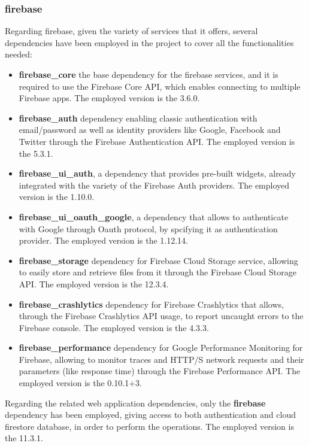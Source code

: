 \subsubsection{firebase}
Regarding firebase, given the variety of services that it offers, several dependencies have been employed in the project to cover all the functionalities needed:

\begin{itemize}[nosep] %
    \item \textbf{firebase\_core\:} the base dependency for the firebase services, and it is required to use the Firebase Core API, which enables connecting to multiple Firebase apps. The employed version is the 3.6.0.
    \item \textbf{firebase\_auth\:} dependency enabling classic authentication with email/password as well as identity providers like Google, Facebook and Twitter through the Firebase Authentication API. The employed version is the 5.3.1.
    \item \textbf{firebase\_ui\_auth}, a dependency that provides pre-built widgets, already integrated with the variety of the Firebase Auth providers. The employed version is the 1.10.0.
    \item \textbf{firebase\_ui\_oauth\_google}, a dependency that allows to authenticate with Google through Oauth protocol, by spcifying it as authentication provider. The employed version is the 1.12.14.
    \item \textbf{firebase\_storage\:} dependency for Firebase Cloud Storage service, allowing to easily store and retrieve files from it through the Firebase Cloud Storage API. The employed version is the 12.3.4.
    \item \textbf{firebase\_crashlytics\:} dependency for Firebase Crashlytics that allows, through the Firebase Crashlytics API usage, to report uncaught errors to the Firebase console. The employed version is the 4.3.3.
    \item \textbf{firebase\_performance\:} dependency for Google Performance Monitoring for Firebase, allowing to monitor traces and HTTP/S network requests and their parameters (like response time) through the Firebase Performance API. The employed version is the 0.10.1+3.
\end{itemize}

\noindent Regarding the related web application dependencies, only the \textbf{firebase} dependency has been employed, giving access to both authentication and cloud firestore database, in order to perform the operations. The employed version is the 11.3.1.

\newpage